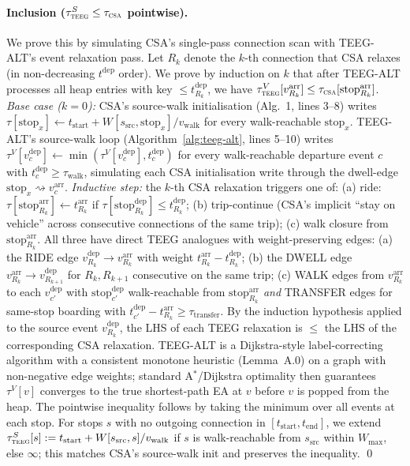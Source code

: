 \documentclass[letterpaper]{article}
\begin{document}
\paragraph{Inclusion ($\tau^S_\textsc{teeg} \leq \tau_\textsc{csa}$ pointwise).}
We prove this by simulating CSA's single-pass connection scan with
TEEG-ALT's event relaxation pass. Let $R_k$ denote the $k$-th
connection that CSA relaxes (in non-decreasing $t^\text{dep}$ order).
We prove by induction on $k$ that after TEEG-ALT processes all heap
entries with key $\leq t^\text{dep}_{R_k}$, we have
$\tau^V_\textsc{teeg}[v^\text{arr}_{R_k}] \leq \tau_\textsc{csa}[\text{stop}^\text{arr}_{R_k}]$.
\emph{Base case ($k=0$):} CSA's source-walk initialisation
(Alg.~1, lines 3--8) writes $\tau[\text{stop}_x] \leftarrow t_\text{start}
+ W[s_\text{src}, \text{stop}_x]/v_\text{walk}$ for every walk-reachable
$\text{stop}_x$. TEEG-ALT's source-walk loop (Algorithm~\ref{alg:teeg-alt},
lines 5--10) writes $\tau^V[v^\text{dep}_c] \leftarrow \min(\tau^V[v^\text{dep}_c], t^\text{dep}_c)$
for every walk-reachable departure event $c$ with
$t^\text{dep}_c \geq \tau_\text{walk}$, simulating each CSA initialisation
write through the dwell-edge $\text{stop}_x \rightsquigarrow v^\text{arr}_c$.
\emph{Inductive step:} the $k$-th CSA relaxation triggers one of:
(a) ride: $\tau[\text{stop}^\text{arr}_{R_k}] \leftarrow t^\text{arr}_{R_k}$
if $\tau[\text{stop}^\text{dep}_{R_k}] \leq t^\text{dep}_{R_k}$;
(b) trip-continue (CSA's implicit ``stay on vehicle'' across consecutive
connections of the same trip);
(c) walk closure from $\text{stop}^\text{arr}_{R_k}$.
All three have direct TEEG analogues with weight-preserving edges:
(a) the RIDE edge $v^\text{dep}_{R_k} \to v^\text{arr}_{R_k}$ with
weight $t^\text{arr}_{R_k} - t^\text{dep}_{R_k}$;
(b) the DWELL edge $v^\text{arr}_{R_k} \to v^\text{dep}_{R_{k+1}}$ for
$R_k, R_{k+1}$ consecutive on the same trip;
(c) WALK edges from $v^\text{arr}_{R_k}$ to each $v^\text{dep}_{c'}$
with $\text{stop}^\text{dep}_{c'}$ walk-reachable from
$\text{stop}^\text{arr}_{R_k}$ \emph{and} TRANSFER edges for same-stop
boarding with $t^\text{dep}_{c'} - t^\text{arr}_{R_k} \geq
\tau_\text{transfer}$. By the induction hypothesis applied to the source
event $v^\text{dep}_{R_k}$, the LHS of each TEEG relaxation is $\leq$
the LHS of the corresponding CSA relaxation. TEEG-ALT is a
Dijkstra-style label-correcting algorithm with a consistent monotone
heuristic (Lemma~A.0) on a graph with non-negative edge weights;
standard A$^*$/Dijkstra optimality then guarantees
$\tau^V[v]$ converges to the true shortest-path EA at $v$ before $v$
is popped from the heap. The pointwise inequality follows by taking
the minimum over all events at each stop. For stops $s$ with no
outgoing connection in $[t_\text{start}, t_\text{end}]$, we extend
$\tau^S_\textsc{teeg}[s] := t_\text{start} + W[s_\text{src},
s]/v_\text{walk}$ if $s$ is walk-reachable from $s_\text{src}$ within
$W_\text{max}$, else $\infty$; this matches CSA's source-walk init
and preserves the inequality. \qed
\end{document}

